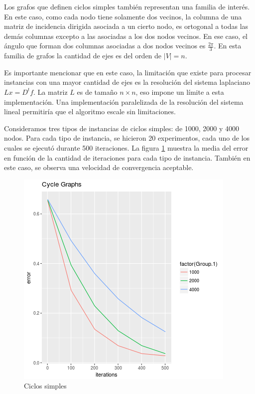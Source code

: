 \documentclass[10pt, a4paper, twocolumn]{article} %
\begin{document}
Los grafos que definen ciclos simples también representan una familia 
de interés. En este caso, como cada nodo tiene solamente dos vecinos, 
la columna de una matriz de incidencia dirigida asociada a un cierto 
nodo, es ortogonal a todas las demás columnas excepto a las asociadas a 
los dos nodos vecinos. En ese caso, el ángulo que forman dos columnas
asociadas a dos nodos vecinos es $\frac{2\pi}{3}$. En esta familia de 
grafos la cantidad de ejes es del orden de $|V| = n$.

\smallskip

Es importante mencionar que en este caso, la limitación que existe para 
procesar instancias con una mayor cantidad de ejes es la resolución del 
sistema laplaciano $Lx = D^t f$. La matriz $L$ es de tamaño $n \times 
n$, eso impone un límite a esta implementación. Una implementación 
paralelizada de la resolución del sistema lineal permitiría que el 
algoritmo escale sin limitaciones.

\smallskip

Consideramos tres tipos de instancias de ciclos simples: de 1000, 2000 
y 4000 nodos. Para cada tipo de instancia, se hicieron 20 experimentos, 
cada uno de los cuales se ejecutó durante 500 iteraciones. La figura 
\ref{fig:cycle} muestra la media del error en función de la cantidad 
de iteraciones para cada tipo de instancia. También en este caso, se 
observa una velocidad de convergencia aceptable.

\begin{figure}
	\includegraphics[width=\linewidth]{cycle_graphs.png} %
	\caption{Ciclos simples} %
	\label{fig:cycle} %
\end{figure}
\end{document}
